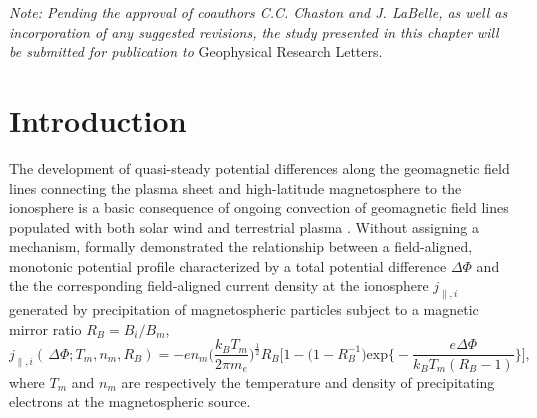 \textit{Note: Pending the approval of coauthors C.C. Chaston and
  J. LaBelle, as well as incorporation of any suggested revisions, the
  study presented in this chapter will be submitted for publication
  to} Geophysical Research Letters.

  \section{Introduction}

  The development of quasi-steady potential differences along the
  geomagnetic field lines connecting the plasma sheet and
  high-latitude magnetosphere to the ionosphere is a basic consequence
  of ongoing convection of geomagnetic field lines populated with both
  solar wind and terrestrial plasma \citep[e.g., review by][Chapter
  3]{Paschmann2003}. Without assigning a mechanism, \citet{Knight1973}
  formally demonstrated the relationship between a field-aligned,
  monotonic potential profile characterized by a total potential
  difference $\Delta \Phi$ and the the corresponding field-aligned
  current density at the ionosphere $j_{\parallel,i}$ generated by
  precipitation of magnetospheric particles subject to a magnetic
  mirror ratio $R_B = B_{i} / B_{m}$,
    \begin{equation} \label{ch6:eqKnight} j_{\parallel,i} ( \, \Delta \Phi ;
      T_m, n_m, R_B ) = - e n_m \Big ( \dfrac{k_B T_m}{2 \pi m_e} \Big
      )^{\frac{1}{2}} R_B \Bigg [ 1 - \Big ( 1 - R_B^{-1} \Big )
      \textrm{exp} \Big \{ - \dfrac{e \Delta \Phi}{k_B T_m ( R_B - 1 )}
      \Big \} \Bigg],
    \end{equation}
  where $T_m$ and $n_m$ are respectively the temperature and density
  of precipitating electrons at the magnetospheric source.


